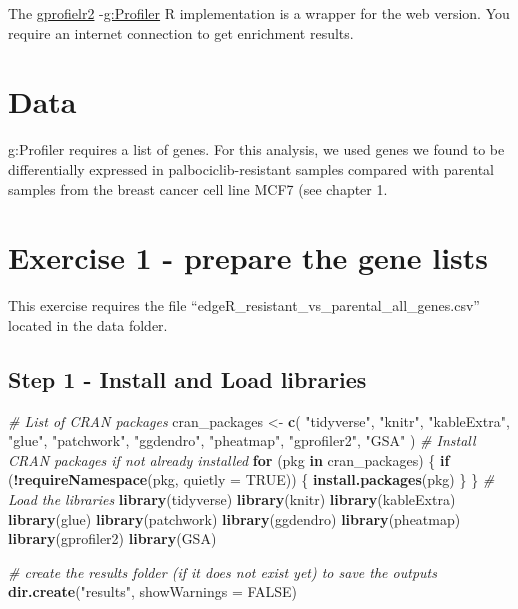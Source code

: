 \documentclass[
]{book}
\newenvironment{Shaded}{\begin{snugshade}}{\end{snugshade}}
\newcommand{\AttributeTok}[1]{\textcolor[rgb]{0.13,0.29,0.53}{#1}}
\newcommand{\CommentTok}[1]{\textcolor[rgb]{0.56,0.35,0.01}{\textit{#1}}}
\newcommand{\ConstantTok}[1]{\textcolor[rgb]{0.56,0.35,0.01}{#1}}
\newcommand{\ControlFlowTok}[1]{\textcolor[rgb]{0.13,0.29,0.53}{\textbf{#1}}}
\newcommand{\FunctionTok}[1]{\textcolor[rgb]{0.13,0.29,0.53}{\textbf{#1}}}
\newcommand{\NormalTok}[1]{#1}
\newcommand{\OtherTok}[1]{\textcolor[rgb]{0.56,0.35,0.01}{#1}}
\newcommand{\SpecialCharTok}[1]{\textcolor[rgb]{0.81,0.36,0.00}{\textbf{#1}}}
\newcommand{\StringTok}[1]{\textcolor[rgb]{0.31,0.60,0.02}{#1}}
\begin{document}
The \href{https://biit.cs.ut.ee/gprofiler/page/r}{gprofielr2} -\href{https://biit.cs.ut.ee/gprofiler/gost}{g:Profiler} R implementation is a wrapper for the web version. You require an internet connection to get enrichment results.

\section{Data}\label{data}

g:Profiler requires a list of genes. For this analysis, we used genes we found to be differentially expressed in palbociclib-resistant samples compared with parental samples from the breast cancer cell line MCF7 (see chapter 1.

\section{Exercise 1 - prepare the gene lists}\label{exercise-1-defined}

This exercise requires the file ``edgeR\_resistant\_vs\_parental\_all\_genes.csv'' located in the data folder.

\subsection{Step 1 - Install and Load libraries}\label{step-1---install-and-load-libraries}

\begin{Shaded}
\begin{Highlighting}[]
\CommentTok{\# List of CRAN packages}
\NormalTok{cran\_packages }\OtherTok{\textless{}{-}} \FunctionTok{c}\NormalTok{(}
  \StringTok{"tidyverse"}\NormalTok{,}
  \StringTok{"knitr"}\NormalTok{,}
  \StringTok{"kableExtra"}\NormalTok{,}
  \StringTok{"glue"}\NormalTok{,}
  \StringTok{"patchwork"}\NormalTok{,}
  \StringTok{"ggdendro"}\NormalTok{,}
  \StringTok{"pheatmap"}\NormalTok{,}
  \StringTok{"gprofiler2"}\NormalTok{,}
  \StringTok{"GSA"}
\NormalTok{)}
\CommentTok{\# Install CRAN packages if not already installed}
\ControlFlowTok{for}\NormalTok{ (pkg }\ControlFlowTok{in}\NormalTok{ cran\_packages) \{}
  \ControlFlowTok{if}\NormalTok{ (}\SpecialCharTok{!}\FunctionTok{requireNamespace}\NormalTok{(pkg, }\AttributeTok{quietly =} \ConstantTok{TRUE}\NormalTok{)) \{}
    \FunctionTok{install.packages}\NormalTok{(pkg)}
\NormalTok{  \}}
\NormalTok{\}}
\CommentTok{\# Load the libraries}
\FunctionTok{library}\NormalTok{(tidyverse)}
\FunctionTok{library}\NormalTok{(knitr)}
\FunctionTok{library}\NormalTok{(kableExtra)}
\FunctionTok{library}\NormalTok{(glue)}
\FunctionTok{library}\NormalTok{(patchwork)}
\FunctionTok{library}\NormalTok{(ggdendro)}
\FunctionTok{library}\NormalTok{(pheatmap)}
\FunctionTok{library}\NormalTok{(gprofiler2)}
\FunctionTok{library}\NormalTok{(GSA)}

\CommentTok{\# create the results folder (if it does not exist yet) to save the outputs}
\FunctionTok{dir.create}\NormalTok{(}\StringTok{"results"}\NormalTok{, }\AttributeTok{showWarnings =} \ConstantTok{FALSE}\NormalTok{)}
\end{Highlighting}
\end{Shaded}
\end{document}
